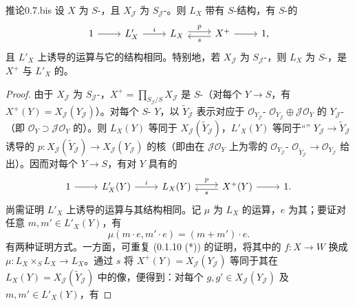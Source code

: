 \begin{SGAresult}{推论}{0.7.bis}
设 $X$ 为 $S$-，且 $X_{\mathcal J}$ 为 $S_{\mathcal J}$-。则 $L_X$ 带有 $S$-结构，有 $S$-的
\[\begin{tikzcd}1\arrow[r]&L'_X\arrow[r,"i"]&L_X\arrow[r,shift left,"p"]&X^+\arrow[l,shift left,"s"]\arrow[r]&1,\end{tikzcd}\]
且 $L'_X$ 上诱导的运算与它的结构相同。特别地，若 $X_{\mathcal J}$ 为 $S_{\mathcal J}$-，则 $L_X$ 为 $S$-，是 $X^+$ 与 $L'_X$ 的。
\end{SGAresult}
\begin{proof}
由于 $X_{\mathcal J}$ 为 $S_{\mathcal J}$-，$X^+=\prod_{S_{\mathcal J}/S}X_{\mathcal J}$ 是 $S$-（对每个 $Y\to S$，有 $X^+(Y)=X_{\mathcal J}(Y_{\mathcal J})$）。对每个 $S$- $Y$，以 $\widetilde Y_{\mathcal J}$ 表示对应于 $\mathcal O_{Y_{\mathcal J}}$- $\mathcal O_{Y_{\mathcal J}}\oplus\mathcal J\mathcal O_Y$ 的 $Y_{\mathcal J}$-（即 $\mathcal O_Y\supset\mathcal J\mathcal O_Y$ 的）。则 $L_X(Y)$ 等同于 $X_{\mathcal J}(\widetilde Y_{\mathcal J})$，$L'_X(Y)$ 等同于“” $Y_{\mathcal J}\to\widetilde Y_{\mathcal J}$ 诱导的 $p:X_{\mathcal J}(\widetilde Y_{\mathcal J})\to X_{\mathcal J}(Y_{\mathcal J})$ 的核（即由在 $\mathcal J\mathcal O_Y$ 上为零的 $\mathcal O_{Y_{\mathcal J}}$- $\mathcal O_{\widetilde Y_{\mathcal J}}\to\mathcal O_{Y_{\mathcal J}}$ 给出）。因而对每个 $Y\to S$，有对 $Y$ 具有的
\[\begin{tikzcd}1\arrow[r]&L'_X(Y)\arrow[r,"i"]&L_X(Y)\arrow[r,shift left,"p"]&X^+(Y)\arrow[l,shift left,"s"]\arrow[r]&1.\end{tikzcd}\]
尚需证明 $L'_X$ 上诱导的运算与其结构相同。记 $\mu$ 为 $L_X$ 的运算，$e$ 为其；要证对任意 $m,m'\in L'_X(Y)$，有
\[\mu(m\cdot e,m'\cdot e)=(m+m')\cdot e.\]
有两种证明方式。一方面，可重复 (0.1.10 (*)) 的证明，将其中的 $f:X\to W$ 换成 $\mu:L_X\times_S L_X\to L_X$。通过 $s$ 将 $X^+(Y)=X_{\mathcal J}(Y_{\mathcal J})$ 等同于其在 $L_X(Y)=X_{\mathcal J}(\widetilde Y_{\mathcal J})$ 中的像，便得到：对每个 $g,g'\in X_{\mathcal J}(Y_{\mathcal J})$ 及 $m,m'\in L'_X(Y)$，有

\end{proof}
